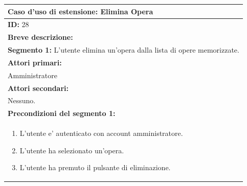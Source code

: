 \documentclass{article}
\begin{document}
                \begin{table}[H]
                    \begin{tabular}{|p{\linewidth}|}
                        \hline
                        \cellcolor{gray!100}
                        \color{white}
                        \centerline{\textbf{Caso d'uso di estensione:} Elimina Opera} \\
                        \hline
                        \textbf{ID:} 28 \\
                        \hline
                        \cellcolor{gray!20}
                        \textbf{Breve descrizione:} \\
                        \cellcolor{gray!20}
                        \textbf{Segmento 1:} L'utente elimina un'opera dalla lista di opere memorizzate. \\
                        \hline
                        \textbf{Attori primari:} \\
                        \begin{minipage}{\linewidth}
                            Amministratore
                        \end{minipage}
                        \vspace{-10pt} \\ %
                        \hline
                        \textbf{Attori secondari:} \\
                        Nessuno. \\
                        \hline
                        \cellcolor{gray!20}
                        \textbf{Precondizioni del segmento 1:} \\
                        \cellcolor{gray!20}
                        \begin{minipage}{\linewidth}
                            \begin{enumerate}
                                \item L'utente e' autenticato con account amministratore.
                                \item L'utente ha selezionato un'opera.
                                \item L'utente ha premuto il pulsante di eliminazione.
                            \end{enumerate}
                        \end{minipage} \\

\end{tabular}
\end{table}
\end{document}
